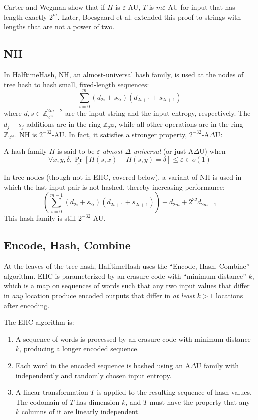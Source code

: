 \documentclass[runningheads]{llncs}
\newcommand{\ints}{\mathbb{Z}}
\begin{document}
Carter and Wegman show that if $H$ is $\varepsilon$-AU, $T$ is $m\varepsilon$-AU for input that has length exactly $2^m$.
Later, Boesgaard et al. extended this proof to strings with lengths that are not a power of two.\cite{badger}

\subsection{NH}

In HalftimeHash, NH, an almost-universal hash family, is used at the nodes of tree hash to hash small, fixed-length sequences:\cite{umac}
\[
\sum_{i=0}^m (d_{2i} + s_{2i})(d_{2i+1} + s_{2i+1})
\]
where $d, s \in \ints_{2^{32}}^{2m+2}$ are the input string and the input entropy, respectively.
The $d_j + s_j$ additions are in the ring $\ints_{2^{32}}$, while all other operations are in the ring $\ints_{2^{64}}$.
NH is $2^{-32}$-AU.
In fact, it satisfies a stronger property, $2^{-32}$-A$\Delta$U:\cite{umac}

\begin{definition}
  A hash family $H$ is said to be {\em $\varepsilon$-almost $\Delta$-universal} (or just A$\Delta$U) when
  \[
  \forall x,y,\delta, \Pr_s[H(s,x) - H(s,y) = \delta] \leq \varepsilon \in o(1)
  \]
\end{definition}

In tree nodes (though not in EHC, covered below), a variant of NH is used in which the last input pair is not hashed, thereby increasing performance:
\[
\left(\sum_{i=0}^{m-1} (d_{2i} + s_{2i})(d_{2i+1} + s_{2i+1})\right) + d_{2m} + 2^{32} d_{2m+1}
\]
This hash family is still $2^{-32}$-AU.\cite{badger}

\subsection{Encode, Hash, Combine}

At the leaves of the tree hash, HalftimeHash uses the ``Encode, Hash, Combine'' algorithm.\cite{ehc-nandi}
EHC is parameterized by an erasure code with ``minimum distance'' $k$, which is a map on sequences of words such that any two input values that differ in {\em any} location produce encoded outputs that differ in {\em at least $k > 1$} locations after encoding.

The EHC algorithm is:
\begin{enumerate}
\item A sequence of words is processed by an erasure code with minimum distance $k$, producing a longer encoded sequence.
\item Each word in the encoded sequence is hashed using an A$\Delta$U family with independently and randomly chosen input entropy.
\item A linear transformation $T$ is applied to the resulting sequence of hash values.
  The codomain of $T$ has dimension $k$, and $T$ must have the property that any $k$ columns of it are linearly independent.
\end{enumerate}
\end{document}
